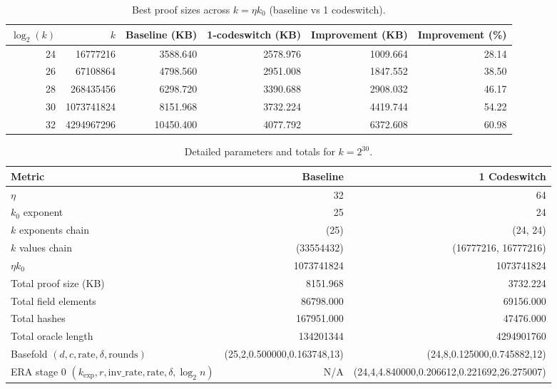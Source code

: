 
\begin{table}[htbp]
\centering
\caption{Best proof sizes across $k=\eta k_0$ (baseline vs 1 codeswitch).}
\begin{tabular}{rrrrrr}
\toprule
$\log_2(k)$ & $k$ & Baseline (KB) & 1-codeswitch (KB) & Improvement (KB) & Improvement (\%) \\
\midrule
24 & 16777216 & 3588.640 & 2578.976 & 1009.664 & 28.14\\
26 & 67108864 & 4798.560 & 2951.008 & 1847.552 & 38.50\\
28 & 268435456 & 6298.720 & 3390.688 & 2908.032 & 46.17\\
30 & 1073741824 & 8151.968 & 3732.224 & 4419.744 & 54.22\\
32 & 4294967296 & 10450.400 & 4077.792 & 6372.608 & 60.98\\
\bottomrule
\end{tabular}
\end{table}

\begin{table}[htbp]
\centering
\caption{Detailed parameters and totals for $k=2^{30}$.}
\begin{tabular}{lrr}
\toprule
Metric & Baseline & 1 Codeswitch \\
\midrule
$\eta$ & 32 & 64\\
$k_0$ exponent & 25 & 24\\
$k$ exponents chain & (25) & (24, 24)\\
$k$ values chain & (33554432) & (16777216, 16777216)\\
$\eta k_0$ & 1073741824 & 1073741824\\
Total proof size (KB) & 8151.968 & 3732.224\\
Total field elements & 86798.000 & 69156.000\\
Total hashes & 167951.000 & 47476.000\\
Total oracle length & 134201344 & 4294901760\\
Basefold $(d,c,\text{rate},\delta,\text{rounds})$ & (25,2,0.500000,0.163748,13) & (24,8,0.125000,0.745882,12)\\
ERA stage 0 $(k_{\text{exp}},r,\text{inv\_rate},\text{rate},\delta,\log_2 n)$ & N/A & (24,4,4.840000,0.206612,0.221692,26.275007)\\
\bottomrule
\end{tabular}
\end{table}

